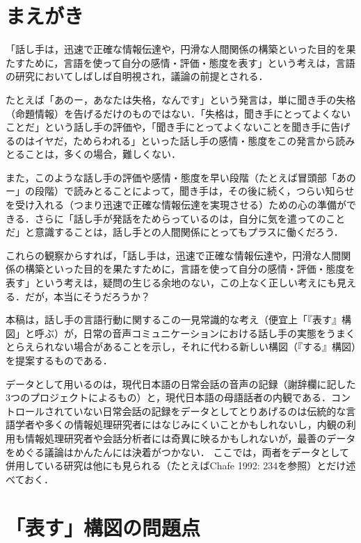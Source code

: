\documentclass[japanese]{jnlp_1.3b}
\begin{document}
\maketitle

\vfill
\section{まえがき}

「話し手は，迅速で正確な情報伝達や，円滑な人間関係の構築といった目的を果たすために，言語を使って自分の感情・評価・態度を表す」という考えは，言語の研究においてしばしば自明視され，議論の前提とされる．

たとえば「あのー，あなたは失格，なんです」という発言は，単に聞き手の失格（命題情報）を告げるだけのものではない．「失格は，聞き手にとってよくないことだ」という話し手の評価や，「聞き手にとってよくないことを聞き手に告げるのはイヤだ，ためらわれる」といった話し手の感情・態度をこの発言から読みとることは，多くの場合，難しくない．

また，このような話し手の評価や感情・態度を早い段階（たとえば冒頭部「あのー」の段階）で読みとることによって，聞き手は，その後に続く，つらい知らせを受け入れる（つまり迅速で正確な情報伝達を実現させる）ための心の準備ができる．さらに「話し手が発話をためらっているのは，自分に気を遣ってのことだ」と意識することは，話し手との人間関係にとってもプラスに働くだろう．

これらの観察からすれば，「話し手は，迅速で正確な情報伝達や，円滑な人間関係の構築といった目的を果たすために，言語を使って自分の感情・評価・態度を表す」という考えは，疑問の生じる余地のない，この上なく正しい考えにも見える．だが，本当にそうだろうか？

本稿は，話し手の言語行動に関するこの一見常識的な考え（便宜上「『表す』構図」と呼ぶ）が，日常の音声コミュニケーションにおける話し手の実態をうまくとらえられない場合があることを示し，それに代わる新しい構図（『する』構図）を提案するものである．

データとして用いるのは，現代日本語の日常会話の音声の記録（謝辞欄に記した3つのプロジェクトによるもの）と，現代日本語の母語話者の内観である．コントロールされていない日常会話の記録をデータとしてとりあげるのは伝統的な言語学者や多くの情報処理研究者にはなじみにくいことかもしれないし，内観の利用も情報処理研究者や会話分析者には奇異に映るかもしれないが，最善のデータをめぐる議論はかんたんには決着がつかない．\pagebreak
ここでは，両者をデータとして併用している研究は他にも見られる（たとえばChafe 1992: 234を参照）とだけ述べておく．


\section{「表す」構図の問題点}
\end{document}

